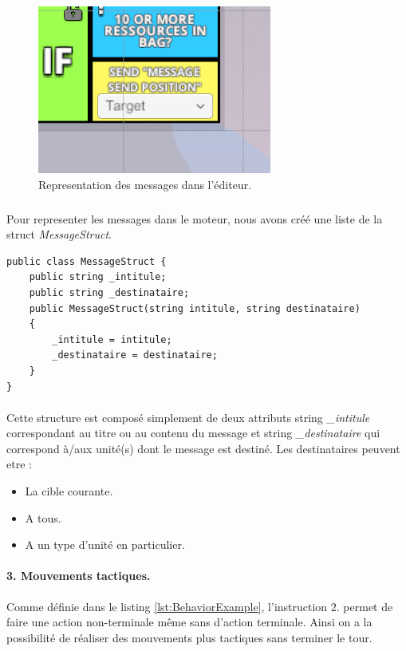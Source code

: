 \documentclass{report}
\begin{document}
\begin{figure}[!h]
       \centering
	\includegraphics[scale=0.55]{PuzzleMessageImage}
	\caption{Representation des messages dans l'éditeur.}
\end{figure}

\subparagraph{} 
Pour representer les messages dans le moteur, nous avons créé une liste de la struct \textit{MessageStruct}.

 \begin{lstlisting}[language={[Sharp]C},label={lst:MessageStructScript}, caption= Code du script MessageStruct.cs]
public class MessageStruct {
    public string _intitule;
    public string _destinataire;
    public MessageStruct(string intitule, string destinataire)
    {
        _intitule = intitule;
        _destinataire = destinataire;
    }
}
\end{lstlisting}

\paragraph{}
Cette structure est composé simplement de deux attributs string \textit{\_intitule} correspondant au titre ou au contenu du message et string \textit{\_destinataire} qui correspond à/aux unité(s) dont le message est destiné. Les destinataires peuvent etre :
\begin{itemize}
\item La cible courante.
\item A tous.
\item A un type d'unité en particulier.
\end{itemize}

\paragraph{3. Mouvements tactiques.}
Comme définie dans le listing \ref{lst:BehaviorExample}, l'instruction 2. permet de faire une action non-terminale même sans d'action terminale.
Ainsi on a la possibilité de réaliser des mouvements plus tactiques sans terminer le tour.
\end{document}
